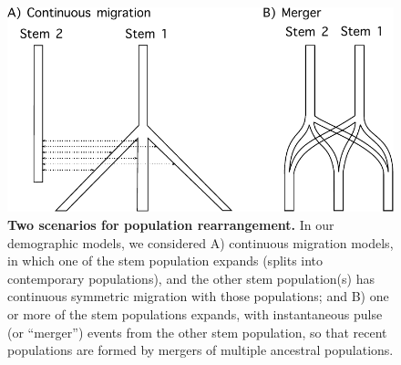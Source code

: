 \documentclass[]{article}
\begin{document}
\clearpage

\begin{figure}[ht]
    \centering
    \includegraphics{figures/mergers.pdf}
    \caption{
        \textbf{Two scenarios for population rearrangement.}
        In our demographic models, we considered
        A) continuous migration models, in which one of the stem population expands 
        (splits into contemporary populations), and the other stem population(s)
        has continuous symmetric migration with those populations;
        and B) one or more of the stem populations expands, with instantaneous pulse
        (or ``merger'') events from the other stem population,
        so that recent populations are formed by mergers
        of multiple ancestral populations.
    }
    \label{fig:mergers}
\end{figure}
\end{document}
